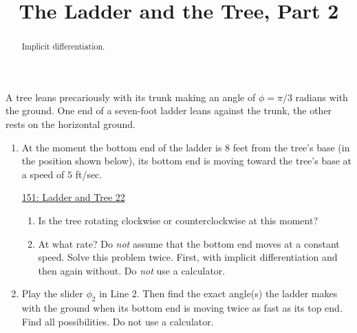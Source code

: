 \documentclass{ximera}
\title{The Ladder and the Tree, Part 2}
\begin{document}
\begin{abstract}
Implicit differentiation.
\end{abstract}
\maketitle


\begin{question}  \label{Qvgggbbhhhggg}
A tree leans precariously with its trunk making an angle of $\phi = \pi/3$ radians with the ground. One end of a seven-foot ladder leans against the trunk, the other rests on the horizontal ground.

\begin{enumerate}
\item At the moment the bottom end of the ladder is $8$ feet from the tree's base (in the position shown below), its bottom end is moving toward the tree's base at a speed of $5$ ft/sec.

 
\begin{onlineOnly}
   \begin{center}
\end{center}
\end{onlineOnly}

\href{https://www.desmos.com/calculator/bscbpblji1}{151: Ladder and Tree 22}

\begin{enumerate}
\item Is the tree rotating clockwise or counterclockwise at this moment?

\item At what rate? Do \emph{not} assume that the bottom end moves at a constant speed. Solve this problem twice. First, with implicit differentiation and then again without. Do \emph{not} use a calculator. 
\end{enumerate}

\item Play the slider $\phi_2$ in Line 2. Then find the exact angle(s) the ladder makes with the ground when its bottom end is moving twice as fast as its top end. Find all possibilities. Do not use a calculator.

\end{enumerate}



\end{question}
\end{document}

